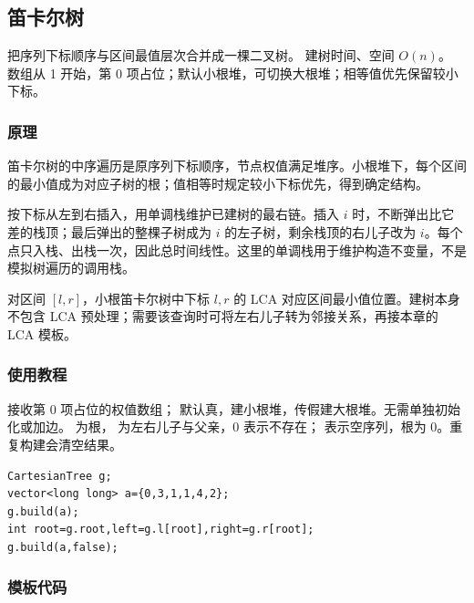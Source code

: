 \subsection{笛卡尔树}
\label{tree:cartesian}
\AlgorithmInfo
    {把序列下标顺序与区间最值层次合并成一棵二叉树。}
    {建树时间、空间 $O(n)$。}
    {数组从 1 开始，第 0 项占位；默认小根堆，可切换大根堆；相等值优先保留较小下标。}
\subsubsection*{原理}
笛卡尔树的中序遍历是原序列下标顺序，节点权值满足堆序。小根堆下，每个区间的最小值成为对应子树的根；值相等时规定较小下标优先，得到确定结构。

按下标从左到右插入，用单调栈维护已建树的最右链。插入 $i$ 时，不断弹出比它差的栈顶；最后弹出的整棵子树成为 $i$ 的左子树，剩余栈顶的右儿子改为 $i$。每个点只入栈、出栈一次，因此总时间线性。这里的单调栈用于维护构造不变量，不是模拟树遍历的调用栈。

对区间 $[l,r]$，小根笛卡尔树中下标 $l,r$ 的 LCA 对应区间最小值位置。建树本身不包含 LCA 预处理；需要该查询时可将左右儿子转为邻接关系，再接本章的 LCA 模板。
\subsubsection*{使用教程}
 接收第 0 项占位的权值数组； 默认真，建小根堆，传假建大根堆。无需单独初始化或加边。 为根， 为左右儿子与父亲，0 表示不存在； 表示空序列，根为 0。重复构建会清空结果。
\begin{lstlisting}[style=mtycpp,numbers=none]
CartesianTree g;
vector<long long> a={0,3,1,1,4,2};
g.build(a);
int root=g.root,left=g.l[root],right=g.r[root];
g.build(a,false);
\end{lstlisting}
\subsubsection*{模板代码}
